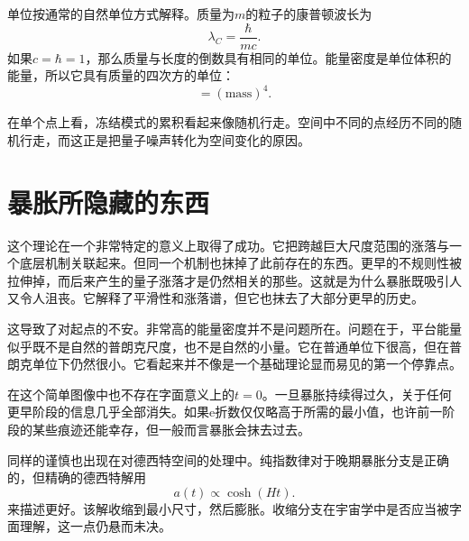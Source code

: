 单位按通常的自然单位方式解释。质量为\(m\)的粒子的康普顿波长为
\begin{equation}
\lambda_C=\frac{\hbar}{mc}.
\end{equation}
如果\(c=\hbar=1\)，那么质量与长度的倒数具有相同的单位。能量密度是单位体积的能量，所以它具有质量的四次方的单位：
\begin{equation}
[\rho]=(\mathrm{mass})^4.
\end{equation}

在单个点上看，冻结模式的累积看起来像随机行走。空间中不同的点经历不同的随机行走，而这正是把量子噪声转化为空间变化的原因。

\begin{classroomqa}
\end{classroomqa}

\section{暴胀所隐藏的东西}

这个理论在一个非常特定的意义上取得了成功。它把跨越巨大尺度范围的涨落与一个底层机制关联起来。但同一个机制也抹掉了此前存在的东西。更早的不规则性被拉伸掉，而后来产生的量子涨落才是仍然相关的那些。这就是为什么暴胀既吸引人又令人沮丧。它解释了平滑性和涨落谱，但它也抹去了大部分更早的历史。

这导致了对起点的不安。非常高的能量密度并不是问题所在。问题在于，平台能量似乎既不是自然的普朗克尺度，也不是自然的小量。它在普通单位下很高，但在普朗克单位下仍然很小。它看起来并不像是一个基础理论显而易见的第一个停靠点。

在这个简单图像中也不存在字面意义上的\(t=0\)。一旦暴胀持续得过久，关于任何更早阶段的信息几乎全部消失。如果e折数仅仅略高于所需的最小值，也许前一阶段的某些痕迹还能幸存，但一般而言暴胀会抹去过去。

同样的谨慎也出现在对德西特空间的处理中。纯指数律对于晚期暴胀分支是正确的，但精确的德西特解用
\begin{equation}
a(t)\propto \cosh(Ht).
\end{equation}
来描述更好。该解收缩到最小尺寸，然后膨胀。收缩分支在宇宙学中是否应当被字面理解，这一点仍悬而未决。

\begin{classroomqa}
\end{classroomqa}


